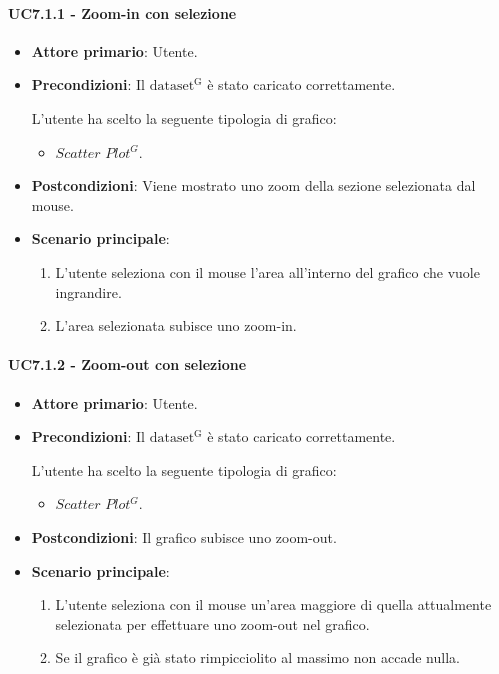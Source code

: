 \paragraph{UC7.1.1 - Zoom-in con selezione}
\label{sec:UC7.1.1}
\begin{itemize}
    \item \textbf{Attore primario}: Utente.
    \item \textbf{Precondizioni}: Il ${\mathrm{dataset^{G}}}$ è stato caricato correttamente. \par L'utente ha scelto la seguente tipologia di grafico:
    \begin{itemize}
    		\item $Scatter$ $Plot^{G}$.
    \end{itemize}
    \item \textbf{Postcondizioni}: Viene mostrato uno zoom della sezione selezionata dal mouse.
    \item \textbf{Scenario principale}:
          \begin{enumerate}
              \item L'utente seleziona con il mouse l'area all'interno del grafico che vuole ingrandire.
              \item L'area selezionata subisce uno zoom-in.
          \end{enumerate}
\end{itemize}

\paragraph{UC7.1.2 - Zoom-out con selezione}
\label{sec:UC7.1.2}
\begin{itemize}
    \item \textbf{Attore primario}: Utente.
    \item \textbf{Precondizioni}: Il ${\mathrm{dataset^{G}}}$ è stato caricato correttamente. \par L'utente ha scelto la seguente tipologia di grafico:
    \begin{itemize}
    		\item $Scatter$ $Plot^{G}$.
    \end{itemize}
    \item \textbf{Postcondizioni}: Il grafico subisce uno zoom-out.
    \item \textbf{Scenario principale}:
          \begin{enumerate}
              \item L'utente seleziona con il mouse un'area maggiore di quella attualmente selezionata per effettuare uno zoom-out nel grafico.
              \item Se il grafico è già stato rimpicciolito al massimo non accade nulla.
          \end{enumerate}
\end{itemize}


